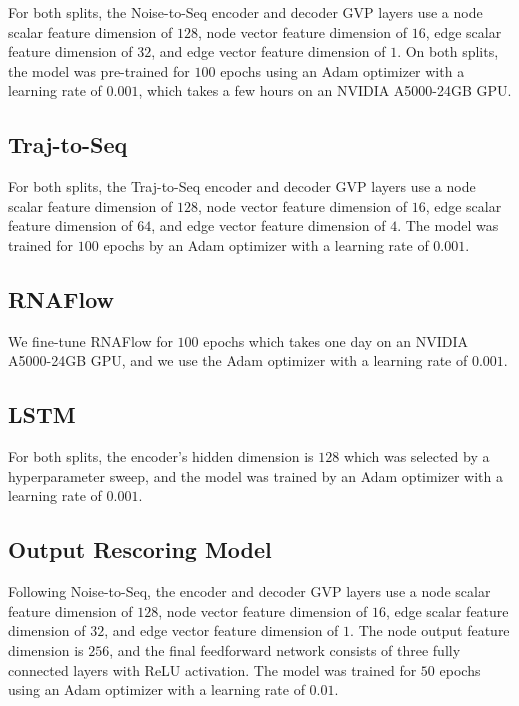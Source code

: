 \documentclass{article}
\theoremstyle{plain}
\theoremstyle{definition}
\theoremstyle{remark}
\begin{document}
For both splits, the Noise-to-Seq encoder and decoder GVP layers use a node scalar feature dimension of $128$, node vector feature dimension of $16$, edge scalar feature dimension of $32$, and edge vector feature dimension of $1$. On both splits, the model was pre-trained for $100$ epochs using an Adam optimizer with a learning rate of $0.001$, which takes a few hours on an NVIDIA A5000-24GB GPU.

\subsection{Traj-to-Seq}

For both splits, the Traj-to-Seq encoder and decoder GVP layers use a node scalar feature dimension of $128$, node vector feature dimension of $16$, edge scalar feature dimension of $64$, and edge vector feature dimension of $4$. The model was trained for $100$ epochs by an Adam optimizer with a learning rate of $0.001$.

\subsection{RNAFlow}

We fine-tune RNAFlow for $100$ epochs which takes one day on an NVIDIA A5000-24GB GPU, and we use the Adam optimizer with a learning rate of $0.001$.

\subsection{LSTM}

For both splits, the encoder's hidden dimension is $128$ which was selected by a hyperparameter sweep, and the model was trained by an Adam optimizer with a learning rate of $0.001$.


\subsection{Output Rescoring Model}

Following Noise-to-Seq, the encoder and decoder GVP layers use a node scalar feature dimension of $128$, node vector feature dimension of $16$, edge scalar feature dimension of $32$, and edge vector feature dimension of $1$. The node output feature dimension is $256$, and the final feedforward network consists of three fully connected layers with ReLU activation. The model was trained for $50$ epochs using an Adam optimizer with a learning rate of $0.01$.


\end{document}
